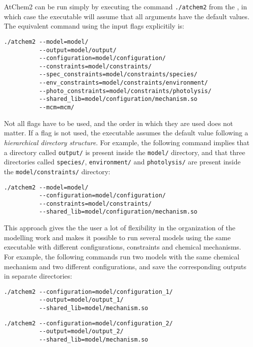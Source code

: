 AtChem2 can be run simply by executing the command \verb|./atchem2|
from the \maindir, in which case the executable will assume that all
arguments have the default values. The equivalent command using the
input flags explicitily is:

\begin{verbatim}
./atchem2 --model=model/
          --output=model/output/
          --configuration=model/configuration/
          --constraints=model/constraints/
          --spec_constraints=model/constraints/species/
          --env_constraints=model/constraints/environment/
          --photo_constraints=model/constraints/photolysis/
          --shared_lib=model/configuration/mechanism.so
          --mcm=mcm/
\end{verbatim}

Not all flags have to be used, and the order in which they are used
does not matter. If a flag is not used, the executable assumes the
default value following a \emph{hierarchical directory structure}. For
example, the following command implies that a directory called
\texttt{output/} is present inside the \texttt{model/} directory, and
that three directories called \texttt{species/}, \texttt{environment/}
and \texttt{photolysis/} are present inside the
\texttt{model/constraints/} directory:

\begin{verbatim}
./atchem2 --model=model/
          --configuration=model/configuration/
          --constraints=model/constraints/
          --shared_lib=model/configuration/mechanism.so
\end{verbatim}

This approach gives the the user a lot of flexibility in the
organization of the modelling work and makes it possible to run
several models using the same executable with different
configurations, constraints and chemical mechanisms. For example, the
following commands run two models with the same chemical mechanism and
two different configurations, and save the corresponding outputs in
separate directories:

\begin{verbatim}
./atchem2 --configuration=model/configuration_1/
          --output=model/output_1/
          --shared_lib=model/mechanism.so
\end{verbatim}

\begin{verbatim}
./atchem2 --configuration=model/configuration_2/
          --output=model/output_2/
          --shared_lib=model/mechanism.so
\end{verbatim}

